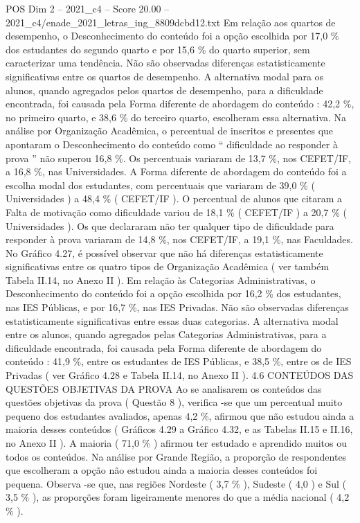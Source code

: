 \begin{textsample}{POS Dim 2 – 2021\_c4 – Score 20.00 – 2021\_c4/enade\_2021\_letras\_ing\_8809dcbd12.txt}
Em relação aos quartos de desempenho, o Desconhecimento do conteúdo foi a opção escolhida por 17,0 \% dos estudantes do segundo quarto e por 15,6 \% do quarto superior, sem caracterizar uma tendência.
Não são observadas diferenças estatisticamente significativas entre os quartos de desempenho.
A alternativa modal para os alunos, quando agregados pelos quartos de desempenho, para a dificuldade encontrada, foi causada pela Forma diferente de abordagem do conteúdo : 42,2 \%, no primeiro quarto, e 38,6 \% do terceiro quarto, escolheram essa alternativa.
Na análise por Organização Acadêmica, o percentual de inscritos e presentes que apontaram o Desconhecimento do conteúdo como “ dificuldade ao responder à prova ” não superou 16,8 \%.
Os percentuais variaram de 13,7 \%, nos CEFET/IF, a 16,8 \%, nas Universidades.
A Forma diferente de abordagem do conteúdo foi a escolha modal dos estudantes, com percentuais que variaram de 39,0 \% ( Universidades ) a 48,4 \% ( CEFET/IF ).
O percentual de alunos que citaram a Falta de motivação como dificuldade variou de 18,1 \% ( CEFET/IF ) a 20,7 \% ( Universidades ).
Os que declararam não ter qualquer tipo de dificuldade para responder à prova variaram de 14,8 \%, nos CEFET/IF, a 19,1 \%, nas Faculdades.
No Gráfico 4.27, é possível observar que não há diferenças estatisticamente significativas entre os quatro tipos de Organização Acadêmica ( ver também Tabela II.14, no Anexo II ).
Em relação às Categorias Administrativas, o Desconhecimento do conteúdo foi a opção escolhida por 16,2 \% dos estudantes, nas IES Públicas, e por 16,7 \%, nas IES Privadas.
Não são observadas diferenças estatisticamente significativas entre essas duas categorias.
A alternativa modal entre os alunos, quando agregados pelas Categorias Administrativas, para a dificuldade encontrada, foi causada pela Forma diferente de abordagem do conteúdo : 41,9 \%, entre os estudantes de IES Públicas, e 38,5 \%, entre os de IES Privadas ( ver Gráfico 4.28 e Tabela II.14, no Anexo II ). 4.6 CONTEÚDOS DAS QUESTÕES OBJETIVAS DA PROVA Ao se analisarem os conteúdos das questões objetivas da prova ( Questão 8 ), verifica -se que um percentual muito pequeno dos estudantes avaliados, apenas 4,2 \%, afirmou que não estudou ainda a maioria desses conteúdos ( Gráficos 4.29 a Gráfico 4.32, e as Tabelas II.15 e II.16, no Anexo II ).
A maioria ( 71,0 \% ) afirmou ter estudado e aprendido muitos ou todos os conteúdos.
Na análise por Grande Região, a proporção de respondentes que escolheram a opção não estudou ainda a maioria desses conteúdos foi pequena.
Observa -se que, nas regiões Nordeste ( 3,7 \% ), Sudeste ( 4,0 ) e Sul ( 3,5 \% ), as proporções foram ligeiramente menores do que a média nacional ( 4,2 \% ).

\end{textsample}
